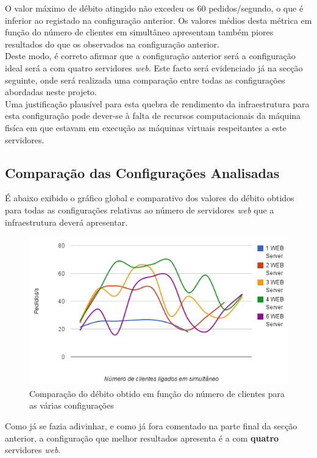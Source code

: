 O valor máximo de débito atingido não excedeu os $60$ pedidos/segundo, o que é inferior ao registado na configuração anterior.
Os valores médios desta métrica em função do número de clientes em simultâneo apresentam também piores resultados do que os observados na configuração anterior. \\

Deste modo, é correto afirmar que a configuração anterior será a configuração ideal será a com quatro servidores \textit{web}.
Este facto será evidenciado já na secção seguinte, onde será realizada uma comparação entre todas as configurações abordadas neste projeto. \\

Uma justificação plausível para esta quebra de rendimento da infraestrutura para esta configuração pode dever-se à falta de recursos computacionais da máquina fisíca em que estavam em execução as máquinas virtuais respeitantes a este servidores.

\newpage
\subsection{Comparação das Configurações Analisadas}

É abaixo exibido o gráfico global e comparativo dos valores do débito obtidos para todas as configurações relativas ao número de servidores \textit{web} que a infraestrutura deverá apresentar. \\

\begin{figure}[!h]
\centering
\includegraphics[scale=.6]{img/ab/web-compare.png}
\caption{Comparação do débito obtido em função do número de clientes para as várias configurações}
\end{figure}

Como já se fazia adivinhar, e como já fora comentado na parte final da secção anterior, a configuração que melhor resultados apresenta é a com \textbf{quatro} servidores \textit{web}. \\

